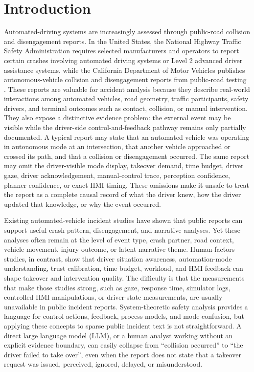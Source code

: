 \section{Introduction}

Automated-driving systems are increasingly assessed through public-road collision and disengagement reports. In the United States, the National Highway Traffic Safety Administration requires selected manufacturers and operators to report certain crashes involving automated driving systems or Level 2 advanced driver assistance systems, while the California Department of Motor Vehicles publishes autonomous-vehicle collision and disengagement reports from public-road testing \citep{nhtsa2021sgo,californiadmv_collision,californiadmv_disengagement}. These reports are valuable for accident analysis because they describe real-world interactions among automated vehicles, road geometry, traffic participants, safety drivers, and terminal outcomes such as contact, collision, or manual intervention. They also expose a distinctive evidence problem: the external event may be visible while the driver-side control-and-feedback pathway remains only partially documented. A typical report may state that an automated vehicle was operating in autonomous mode at an intersection, that another vehicle approached or crossed its path, and that a collision or disengagement occurred. The same report may omit the driver-visible mode display, takeover demand, time budget, driver gaze, driver acknowledgement, manual-control trace, perception confidence, planner confidence, or exact HMI timing. These omissions make it unsafe to treat the report as a complete causal record of what the driver knew, how the driver updated that knowledge, or why the event occurred.

Existing automated-vehicle incident studies have shown that public reports can support useful crash-pattern, disengagement, and narrative analyses. Yet these analyses often remain at the level of event type, crash partner, road context, vehicle movement, injury outcome, or latent narrative theme. Human-factors studies, in contrast, show that driver situation awareness, automation-mode understanding, trust calibration, time budget, workload, and HMI feedback can shape takeover and intervention quality. The difficulty is that the measurements that make those studies strong, such as gaze, response time, simulator logs, controlled HMI manipulations, or driver-state measurements, are usually unavailable in public incident reports. System-theoretic safety analysis provides a language for control actions, feedback, process models, and mode confusion, but applying these concepts to sparse public incident text is not straightforward. A direct large language model (LLM), or a human analyst working without an explicit evidence boundary, can easily collapse from ``collision occurred'' to ``the driver failed to take over'', even when the report does not state that a takeover request was issued, perceived, ignored, delayed, or misunderstood.

